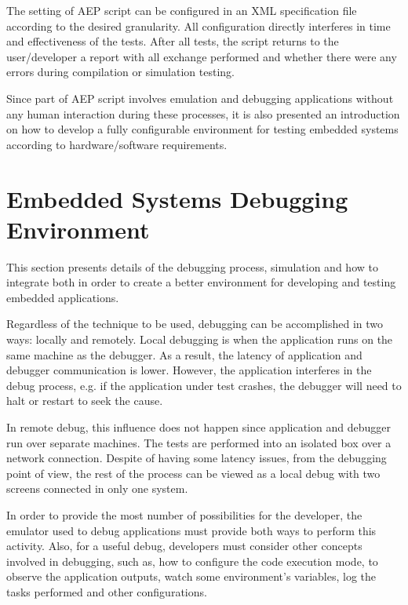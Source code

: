 \documentclass[conference]{IEEEtran}
\begin{document}
The setting of AEP script can be configured in an XML specification file according to the desired granularity. All configuration directly interferes in time and effectiveness of the tests. After all tests, the script returns to the user/developer a report with all exchange performed and whether there were any errors during compilation or simulation testing.

Since part of AEP script involves emulation and debugging applications without any human interaction during these processes, it is also presented an introduction on how to develop a fully configurable environment for testing embedded systems according to hardware/software requirements.

\section{Embedded Systems Debugging Environment}
This section presents details of the debugging process, simulation and how to integrate both in order to create a better environment for developing and testing embedded applications.

Regardless of the technique to be used, debugging can be accomplished in two ways: locally and remotely. Local debugging is when the application runs on the same machine as the debugger. As a result, the latency of application and debugger communication is lower. However, the application interferes in the debug process, e.g. if the application under test crashes, the debugger will need to halt or restart to seek the cause.

In remote debug, this influence does not happen since application and debugger run over separate machines. The tests are performed into an isolated box over a network connection. Despite of having some latency issues, from the debugging point of view, the rest of the process can be viewed as a local debug with two screens connected in only one system.

In order to provide the most number of possibilities for the developer, the emulator used to debug applications must provide both ways to perform this activity. Also, for a useful debug, developers must consider other concepts involved in debugging, such as, how to configure the code execution mode, to observe the application outputs, watch some environment's variables, log the tasks performed and other configurations.

\end{document}
